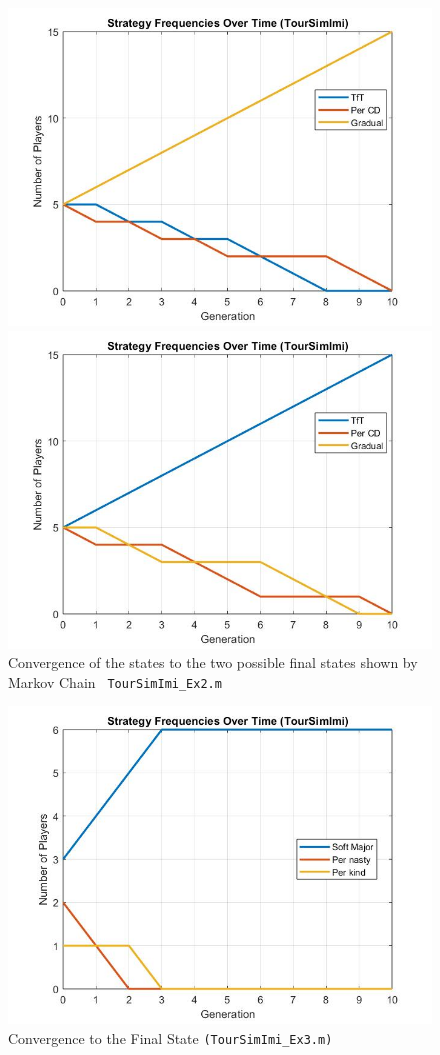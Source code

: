 \begin{figure}[ht!]
	\centering
	\begin{minipage}{0.48\textwidth}
		\centering
		\includegraphics[width=0.8\linewidth]{toursimimi2}
	
	
	\end{minipage}
	\hfill
	\begin{minipage}{0.48\textwidth}
		\centering
		\includegraphics[width=0.8\linewidth]{toursimimi22}
	
	
	\end{minipage}
	\caption{Convergence of the states to the two possible final states shown by Markov Chain \texttt{  TourSimImi\_Ex2.m  }}
\end{figure}
\begin{figure}
	\centering
	
	\includegraphics[width=0.7\linewidth]{toursimimi3}
	\caption{Convergence to the Final State   \texttt{(TourSimImi\_Ex3.m)}}
	\label{fig:toursimimi3}
\end{figure}

